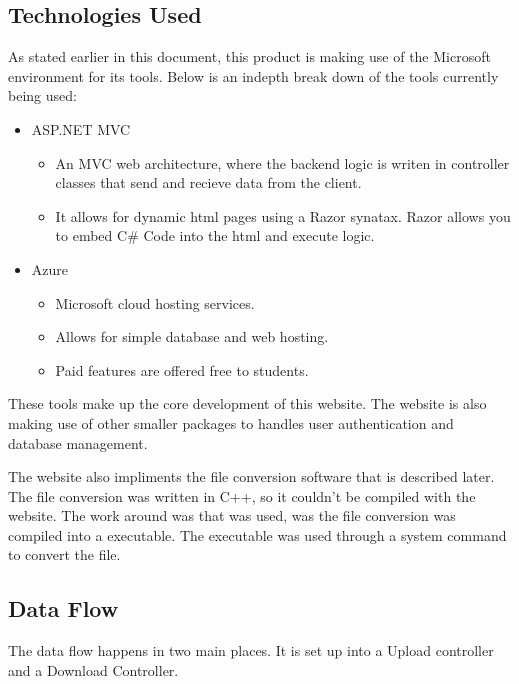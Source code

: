 \subsection{Technologies Used}

    As stated earlier in this document, this product is making use
    of the Microsoft environment for its tools. Below is an indepth 
    break down of the tools currently being used:

    \begin{itemize}
    \item ASP.NET MVC
    \begin{itemize}
        \item An MVC web architecture, where the backend logic is writen in controller classes
        that send and recieve data from the client.
        \item It allows for dynamic html pages using a Razor synatax. Razor allows
        you to embed C\# Code into the html and execute logic.
    \end{itemize}
    
    \item Azure
        \begin{itemize}
            \item Microsoft cloud hosting services.
            \item Allows for simple database and web hosting.
            \item Paid features are offered free to students.
        \end{itemize}
    \end{itemize}

    These tools make up the core development of this website. The website is also
    making use of other smaller packages to handles user authentication and database management.

    The website also impliments the file conversion software that is described later.
    The file conversion was written in C++, so it couldn't be compiled with the website.
    The work around was that was used, was the file conversion was compiled into a executable.
    The executable was used through a system command to convert the file.


    \subsection{Data Flow}
    The data flow happens in two main places. It is set up into a Upload controller
    and a Download Controller.

